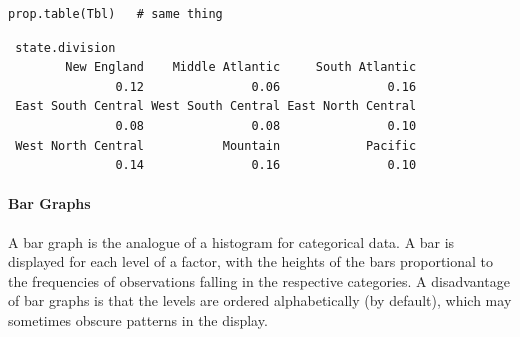 \documentclass[captions=tableheading]{scrbook}
\begin{document}
\begin{verbatim}
prop.table(Tbl)   # same thing
\end{verbatim}

\begin{verbatim}
 state.division
        New England    Middle Atlantic     South Atlantic 
               0.12               0.06               0.16 
 East South Central West South Central East North Central 
               0.08               0.08               0.10 
 West North Central           Mountain            Pacific 
               0.14               0.16               0.10
\end{verbatim}


\paragraph*{Bar Graphs}
\label{par:Bar-Graphs}

A bar graph is the analogue of a histogram for categorical data. A bar is displayed for each level of a factor, with the heights of the bars proportional to the frequencies of observations falling in the respective categories. A disadvantage of bar graphs is that the levels are ordered alphabetically (by default), which may sometimes obscure patterns in the display. 
\end{document}
